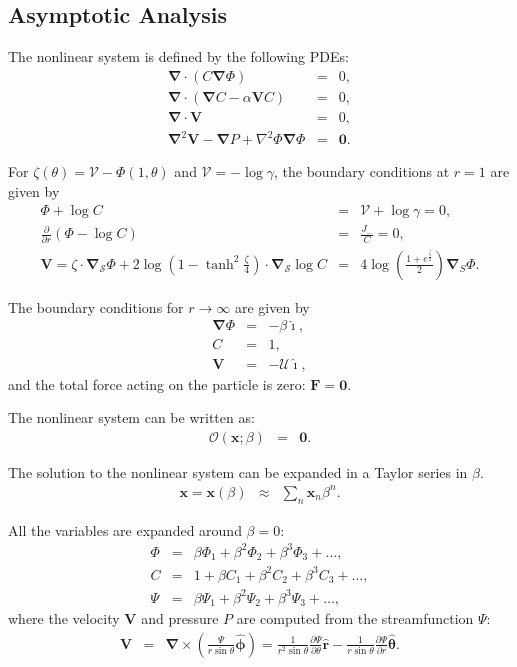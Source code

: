 \documentclass[final]{elsarticle}
\newcommand{\deriv}[2]{\frac{\partial #1}{\partial #2}}
\newcommand{\pars}[1]{\left(#1\right)}
\newcommand\Laplacian{\nabla^2}
\newcommand\bnabla{\boldsymbol{\nabla}}
\newcommand\bLaplacian{\boldsymbol{\nabla}^2}
\newcommand\bV{\boldsymbol{V}}
\newcommand\bF{\boldsymbol{F}}
\newcommand\bx{\boldsymbol{x}}
\newcommand\br{\boldsymbol{r}}
\newcommand\brhat{\hat{\br}}
\newcommand\btheta{\boldsymbol{\theta}}
\newcommand\bthetahat{\hat{\btheta}}
\newcommand\bphi{\boldsymbol{\phi}}
\newcommand\bphihat{\hat{\bphi}}
\newcommand\bzero{\boldsymbol{0}}
\newcommand\cO{\mathcal{O}}
\newcommand\cU{\mathscr{U}}
\newcommand\cV{\mathscr{V}}
\newcommand\ui{\boldsymbol{\hat{\imath}}}
\begin{document}
\begin{appendix}
\section{Asymptotic Analysis} \label{app:asymp}
The nonlinear system is defined by the following PDEs:
\label{PDEs}
\begin{eqnarray*}
\bnabla \cdot \pars{C \bnabla \varPhi} &=& 0, \\
\bnabla \cdot \pars{\bnabla C - \alpha \bV C} &=& 0, \\
\bnabla \cdot \bV &=& 0, \\
\bLaplacian \bV - \bnabla P + \Laplacian \varPhi \bnabla \varPhi &=& \bzero.
\end{eqnarray*}

For $\zeta(\theta) = \cV - \varPhi(1, \theta)$ and 
$\cV = -\log \gamma$, the boundary conditions at $r = 1$ are given by
\begin{eqnarray*}
\varPhi + \log C &=& \cV + \log \gamma = 0, \\
\deriv{}{r}\pars{\varPhi - \log C} &=& \frac{J_-}{C} = 0, \\
\bV = \zeta \cdot \bnabla_\mathcal{S} \varPhi 
+ 2\log\pars{1-\tanh^2\frac{\zeta}{4}} \cdot \bnabla_\mathcal{S} \log C
&=& 4\log\pars{\frac{1 + e^\frac{\zeta}{2}}{2}} \bnabla_S \varPhi.
\end{eqnarray*}

The boundary conditions for $r \rightarrow \infty$ are given by
\begin{eqnarray*}
\bnabla \varPhi &=& -\beta \ui, \\
C &=& 1, \\
\bV &=& -\cU \ui,
\end{eqnarray*}
and the total force acting on the particle is zero: $\bF = \bzero$.

The nonlinear system can be written as: 
\begin{eqnarray*}
\cO(\bx;\beta) &=& \bzero.
\end{eqnarray*}

The solution to the nonlinear system can be expanded in a Taylor series in $\beta$.
\begin{eqnarray*}
\bx = \bx(\beta) &\approx& \sum_n \bx_n \beta^n.
\end{eqnarray*}

All the variables are expanded around $\beta = 0$:
\begin{eqnarray*}
\varPhi &=& \beta \varPhi_1 + \beta^2 \varPhi_2 + \beta^3 \varPhi_3 + \ldots, \\
C &=& 1 + \beta C_1 + \beta^2 C_2 + \beta^3 C_3 + \ldots, \\
\Psi &=& \beta \Psi_1 + \beta^2 \Psi_2 + \beta^3 \Psi_3 + \ldots ,
\end{eqnarray*}
where the velocity $\bV$ and pressure $P$ are computed from the streamfunction $\Psi$:
\begin{eqnarray*}
\bV &=& \bnabla \times \pars{\frac{\Psi}{r \sin\theta} \bphihat} 
= \frac{1}{r^2 \sin\theta} \deriv{\Psi}{\theta} \brhat 
- \frac{1}{r \sin\theta} \deriv{\Psi}{r} \bthetahat.
\end{eqnarray*}


\end{appendix}
\end{document}
